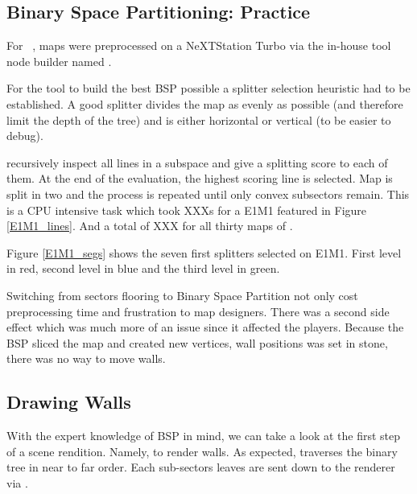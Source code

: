 \subsection{Binary Space Partitioning: Practice}
For \doom~, maps were preprocessed on a NeXTStation Turbo via the in-house tool node builder named .\\
\par
For the tool to build the best BSP possible a splitter selection heuristic had to be established. A good splitter divides the map as evenly as possible (and therefore limit the depth of the tree) and is either horizontal or vertical (to be easier to debug).\\
\par
  recursively inspect all lines in a subspace and give a splitting score to each of them. At the end of the evaluation, the highest scoring line is selected. Map is split in two and the process is repeated until only convex subsectors remain. This is a CPU intensive task which took XXXs for a E1M1 featured in Figure \ref{E1M1_lines}. And a total of XXX for all thirty maps of .\\
\par
{}
\par
Figure \ref{E1M1_segs} shows the seven first splitters selected on E1M1. First level in red, second level in blue and the third level in green.\\
\par
Switching from sectors flooring to Binary Space Partition not only cost preprocessing time and frustration to map designers. There was a second side effect which was much more of an issue since it affected the players. Because the BSP sliced the map and created new vertices, wall positions was set in stone, there was no way to move walls.


\par


\subsection{Drawing Walls}
With the expert knowledge of BSP in mind, we can take a look at the first step of a scene rendition. Namely, to render walls. As expected,  traverses the binary tree in near to far order. Each sub-sectors leaves are sent down to the renderer via .\\
\par
{}
\par


